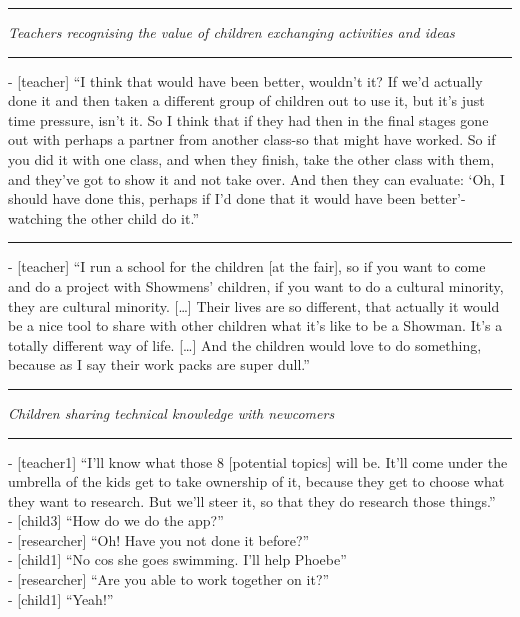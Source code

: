 \par\noindent\rule{\textwidth}{1pt}

\textit{Teachers recognising the value of children exchanging activities and ideas}

\par\noindent\rule{\textwidth}{1pt}

- [teacher] “I think that would have been better, wouldn’t it? If we’d actually done it and then taken a different group of children out to use it, but it’s just time pressure, isn’t it. So I think that if they had then in the final stages gone out with perhaps a partner from another class-so that might have worked. So if you did it with one class, and when they finish, take the other class with them, and they’ve got to show it and not take over. And then they can evaluate: ‘Oh, I should have done this, perhaps if I’d done that it would have been better’-watching the other child do it.”

{\centering
  \noindent\rule{0.5\textwidth}{0.4pt}\par
}

- [teacher] “I run a school for the children [at the fair], so if you want to come and do a project with Showmens’ children, if you want to do a cultural minority, they are cultural minority. […] Their lives are so different, that actually it would be a nice tool to share with other children what it’s like to be a Showman. It’s a totally different way of life. […] And the children would love to do something, because as I say their work packs are super dull.”

\par\noindent\rule{\textwidth}{1pt}

\textit{Children sharing technical knowledge with newcomers}

\par\noindent\rule{\textwidth}{1pt}

- [teacher1] “I’ll know what those 8 [potential topics] will be. It’ll come under the umbrella of the kids get to take ownership of it, because they get to choose what they want to research. But we’ll steer it, so that they do research those things.”\\
- [child3] “How do we do the app?”\\
- [researcher] “Oh! Have you not done it before?”\\
- [child1] “No cos she goes swimming. I’ll help Phoebe”\\
- [researcher] “Are you able to work together on it?”\\
- [child1] “Yeah!”

